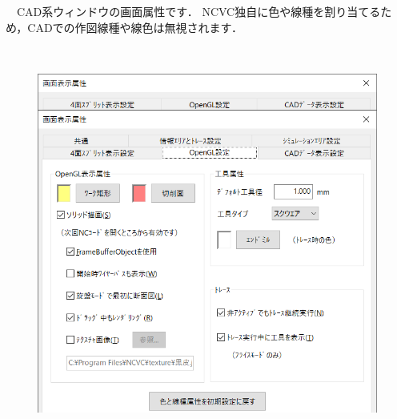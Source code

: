 \begin{minipage}[t]{0.38\textwidth}
　CAD系ウィンドウの画面属性です．
NCVC独自に色や線種を割り当てるため，CADでの作図線種や線色は無視されます．
\end{minipage}
\begin{minipage}[t]{0.02\textwidth}
　
\end{minipage}
\begin{minipage}[t]{0.6\textwidth}
\vspace*{-2zh}
\begin{figure}[H]
\centering
\includegraphics[width=\textwidth]{No6/fig/disp6.png}
\label{fig:disp6.png}
\end{figure}
\end{minipage}

